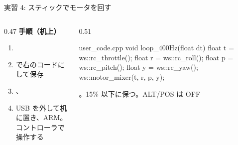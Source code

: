 \begin{frame}[fragile]{実習 4: スティックでモータを回す}
  \begin{columns}[T]
    \begin{column}{0.47\textwidth}
      {\footnotesize\textbf{\textcolor{sfblue}{手順（机上）}}}\par\vspace{-2pt}
      \footnotesize
      \begin{enumerate}\setlength{\itemsep}{0pt}
        \item {}
        \item {} で右のコードにして保存
        \item {}、
        \item USB を外して机に置き、ARM。コントローラで操作する
      \end{enumerate}
    \end{column}
    \begin{column}{0.51\textwidth}
      \begin{sflisting}[basicstyle=\ttfamily\scriptsize]{user\_code.cpp}
void loop_400Hz(float dt) {
    float t = ws::rc_throttle();
    float r = ws::rc_roll();
    float p = ws::rc_pitch();
    float y = ws::rc_yaw();
    ws::motor_mixer(t, r, p, y);
}
      \end{sflisting}
      {\scriptsize {}。15\% 以下に保つ。ALT/POS は OFF\par}
    \end{column}
  \end{columns}
\end{frame}
